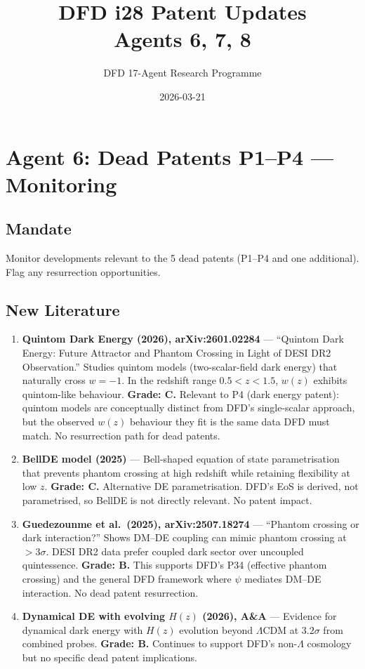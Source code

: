 \documentclass[11pt,a4paper]{article}
\title{DFD i28 Patent Updates\\Agents 6, 7, 8}
\author{DFD 17-Agent Research Programme}
\date{2026-03-21}
\begin{document}
\maketitle
\tableofcontents
\newpage

\section{Agent 6: Dead Patents P1--P4 --- Monitoring}

\subsection{Mandate}
Monitor developments relevant to the 5 dead patents (P1--P4 and one additional). Flag any resurrection opportunities.

\subsection{New Literature}

\begin{enumerate}

\item \textbf{Quintom Dark Energy (2026), arXiv:2601.02284} --- ``Quintom Dark Energy: Future Attractor and Phantom Crossing in Light of DESI DR2 Observation.'' Studies quintom models (two-scalar-field dark energy) that naturally cross $w = -1$. In the redshift range $0.5 < z < 1.5$, $w(z)$ exhibits quintom-like behaviour. \textbf{Grade: C.} Relevant to P4 (dark energy patent): quintom models are conceptually distinct from DFD's single-scalar approach, but the observed $w(z)$ behaviour they fit is the same data DFD must match. No resurrection path for dead patents.

\item \textbf{BellDE model (2025)} --- Bell-shaped equation of state parametrisation that prevents phantom crossing at high redshift while retaining flexibility at low $z$. \textbf{Grade: C.} Alternative DE parametrisation. DFD's EoS is derived, not parametrised, so BellDE is not directly relevant. No patent impact.

\item \textbf{Guedezounme et al.\ (2025), arXiv:2507.18274} --- ``Phantom crossing or dark interaction?'' Shows DM--DE coupling can mimic phantom crossing at $>3\sigma$. DESI DR2 data prefer coupled dark sector over uncoupled quintessence. \textbf{Grade: B.} This supports DFD's P34 (effective phantom crossing) and the general DFD framework where $\psi$ mediates DM--DE interaction. No dead patent resurrection.

\item \textbf{Dynamical DE with evolving $H(z)$ (2026), A\&A} --- Evidence for dynamical dark energy with $H(z)$ evolution beyond $\Lambda$CDM at $3.2\sigma$ from combined probes. \textbf{Grade: B.} Continues to support DFD's non-$\Lambda$ cosmology but no specific dead patent implications.

\end{enumerate}
\end{document}

